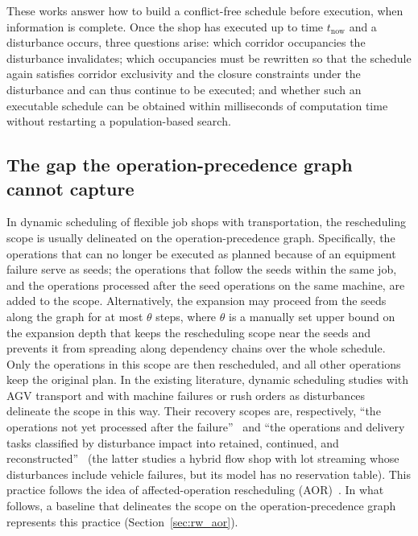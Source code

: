 \documentclass[manuscript,screen,review]{acmart}
\begin{document}
These works answer how to build a conflict-free schedule before execution, when information is complete. Once the shop has executed up to time \(t_{\mathrm{now}}\) and a disturbance occurs, three questions arise:
which corridor occupancies the disturbance invalidates; which occupancies must be rewritten so that the schedule again satisfies corridor exclusivity and the closure constraints under the disturbance and can thus continue to be executed;
and whether such an executable schedule can be obtained within milliseconds of computation time without restarting a population-based search.

\subsection{The gap the operation-precedence graph cannot capture}

In dynamic scheduling of flexible job shops with transportation, the rescheduling scope is usually delineated on the operation-precedence graph.
Specifically, the operations that can no longer be executed as planned because of an equipment failure serve as seeds; the operations that follow the seeds within the same job,
and the operations processed after the seed operations on the same machine, are added to the scope. Alternatively, the expansion may proceed from the seeds along the graph for at most \(\theta\) steps,
where \(\theta\) is a manually set upper bound on the expansion depth that keeps the rescheduling scope near the seeds and prevents it from spreading along dependency chains over the whole schedule.
Only the operations in this scope are then rescheduled, and all other operations keep the original plan.
In the existing literature, dynamic scheduling studies with AGV transport and with machine failures or rush orders as disturbances delineate the scope in this way. Their recovery scopes are, respectively, ``the operations not yet processed after the failure''~\cite{zhang2023energy}
and ``the operations and delivery tasks classified by disturbance impact into retained, continued, and reconstructed''~\cite{tang2026dynamic} (the latter studies a hybrid flow shop with lot streaming whose disturbances include vehicle failures, but its model has no reservation table).
This practice follows the idea of affected-operation rescheduling (AOR)~\cite{subramaniam2003maor}.
In what follows, a baseline that delineates the scope on the operation-precedence graph represents this practice (Section~\ref{sec:rw_aor}).
\end{document}
